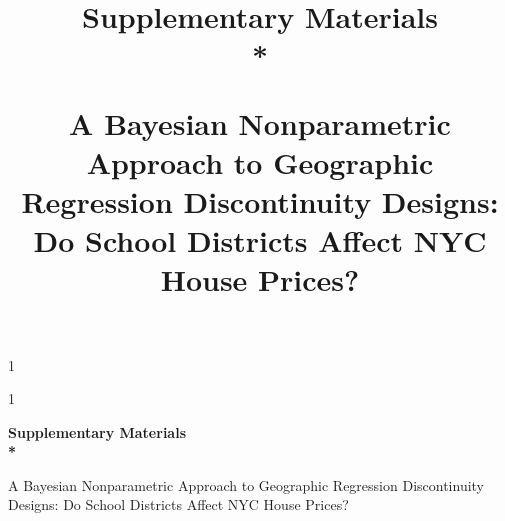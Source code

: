 \documentclass[letter,12pt]{article}
\newcommand{\georddtitle}{
    A Bayesian Nonparametric Approach to Geographic Regression Discontinuity Designs:
    Do School Districts Affect NYC House Prices?
}
\newcommand{\blind}{1}
\begin{document}
\doublespacing



\blind
{
\title{
	\bf
	\Large
	Supplementary Materials
	\\*
    \large
    \georddtitle
}
\author{\georddauthor}
\maketitle
} \fi

\blind
{
  \bigskip
  \bigskip
  \bigskip
  \begin{center}
	\bf 
	\LARGE
	Supplementary Materials
	\\*
	\large
	\georddtitle
  \end{center}
  \medskip
} \fi





\end{document}
